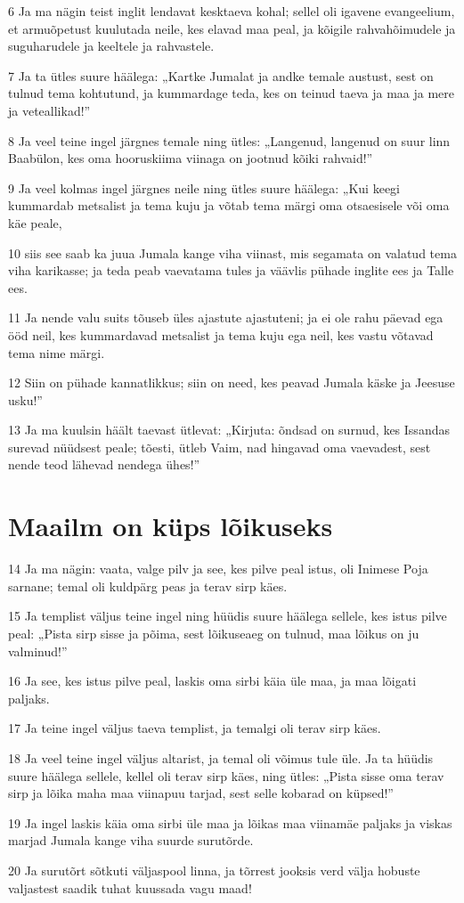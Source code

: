 \par 6 Ja ma nägin teist inglit lendavat kesktaeva kohal; sellel oli igavene evangeelium, et armuõpetust kuulutada neile, kes elavad maa peal, ja kõigile rahvahõimudele ja suguharudele ja keeltele ja rahvastele.
\par 7 Ja ta ütles suure häälega: „Kartke Jumalat ja andke temale austust, sest on tulnud tema kohtutund, ja kummardage teda, kes on teinud taeva ja maa ja mere ja veteallikad!”
\par 8 Ja veel teine ingel järgnes temale ning ütles: „Langenud, langenud on suur linn Baabülon, kes oma hooruskiima viinaga on jootnud kõiki rahvaid!”
\par 9 Ja veel kolmas ingel järgnes neile ning ütles suure häälega: „Kui keegi kummardab metsalist ja tema kuju ja võtab tema märgi oma otsaesisele või oma käe peale,
\par 10 siis see saab ka juua Jumala kange viha viinast, mis segamata on valatud tema viha karikasse; ja teda peab vaevatama tules ja väävlis pühade inglite ees ja Talle ees.
\par 11 Ja nende valu suits tõuseb üles ajastute ajastuteni; ja ei ole rahu päevad ega ööd neil, kes kummardavad metsalist ja tema kuju ega neil, kes vastu võtavad tema nime märgi.
\par 12 Siin on pühade kannatlikkus; siin on need, kes peavad Jumala käske ja Jeesuse usku!”
\par 13 Ja ma kuulsin häält taevast ütlevat: „Kirjuta: õndsad on surnud, kes Issandas surevad nüüdsest peale; tõesti, ütleb Vaim, nad hingavad oma vaevadest, sest nende teod lähevad nendega ühes!”

\section*{Maailm on küps lõikuseks}

\par 14 Ja ma nägin: vaata, valge pilv ja see, kes pilve peal istus, oli Inimese Poja sarnane; temal oli kuldpärg peas ja terav sirp käes.
\par 15 Ja templist väljus teine ingel ning hüüdis suure häälega sellele, kes istus pilve peal: „Pista sirp sisse ja põima, sest lõikuseaeg on tulnud, maa lõikus on ju valminud!”
\par 16 Ja see, kes istus pilve peal, laskis oma sirbi käia üle maa, ja maa lõigati paljaks.
\par 17 Ja teine ingel väljus taeva templist, ja temalgi oli terav sirp käes.
\par 18 Ja veel teine ingel väljus altarist, ja temal oli võimus tule üle. Ja ta hüüdis suure häälega sellele, kellel oli terav sirp käes, ning ütles: „Pista sisse oma terav sirp ja lõika maha maa viinapuu tarjad, sest selle kobarad on küpsed!”
\par 19 Ja ingel laskis käia oma sirbi üle maa ja lõikas maa viinamäe paljaks ja viskas marjad Jumala kange viha suurde surutõrde.
\par 20 Ja surutõrt sõtkuti väljaspool linna, ja tõrrest jooksis verd välja hobuste valjastest saadik tuhat kuussada vagu maad!


